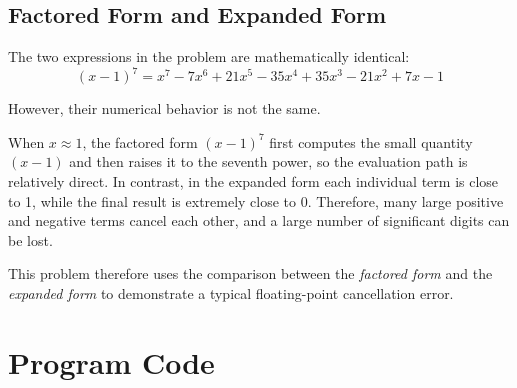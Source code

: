 \documentclass[12pt,a4paper]{article}
\begin{document}
\subsection*{Factored Form and Expanded Form}

The two expressions in the problem are mathematically identical:
\[
(x-1)^7=x^7-7x^6+21x^5-35x^4+35x^3-21x^2+7x-1
\]

However, their numerical behavior is not the same.

When $x\approx 1$, the factored form $(x-1)^7$ first computes the small quantity $(x-1)$ and then raises it to the seventh power, so the evaluation path is relatively direct. In contrast, in the expanded form each individual term is close to 1, while the final result is extremely close to 0. Therefore, many large positive and negative terms cancel each other, and a large number of significant digits can be lost.

This problem therefore uses the comparison between the \textit{factored form} and the \textit{expanded form} to demonstrate a typical floating-point cancellation error.

\section{Program Code}
\end{document}
